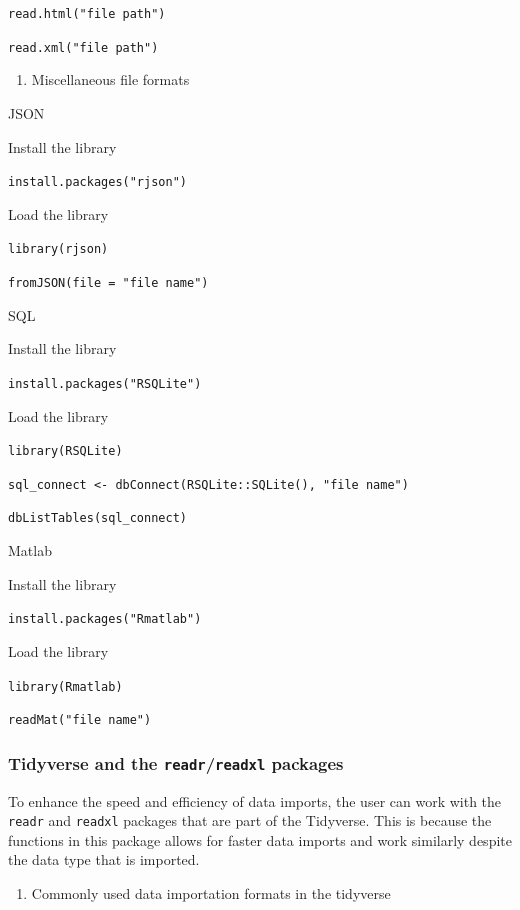 \documentclass[
  letterpaper,
  DIV=11,
  numbers=noendperiod]{scrreprt}
\providecommand{\tightlist}{%
  \setlength{\itemsep}{0pt}\setlength{\parskip}{0pt}}\usepackage{longtable,booktabs,array}
\begin{document}
\texttt{read.html("file\ path")}

\texttt{read.xml("file\ path")}

\begin{enumerate}
\def\labelenumi{\alph{enumi}.}
\setcounter{enumi}{4}
\tightlist
\item
  Miscellaneous file formats
\end{enumerate}

JSON

Install the library

\texttt{install.packages("rjson")}

Load the library

\texttt{library(rjson)}

\texttt{fromJSON(file\ =\ "file\ name")}

SQL

Install the library

\texttt{install.packages("RSQLite")}

Load the library

\texttt{library(RSQLite)}

\texttt{sql\_connect\ \textless{}-\ dbConnect(RSQLite::SQLite(),\ "file\ name")}

\texttt{dbListTables(sql\_connect)}

Matlab

Install the library

\texttt{install.packages("Rmatlab")}

Load the library

\texttt{library(Rmatlab)}

\texttt{readMat("file\ name")}

\subsubsection{\texorpdfstring{Tidyverse and the
\texttt{readr}/\texttt{readxl}
packages}{Tidyverse and the readr/readxl packages}}\label{tidyverse-and-the-readrreadxl-packages}

To enhance the speed and efficiency of data imports, the user can work
with the \texttt{readr} and \texttt{readxl} packages that are part of
the Tidyverse. This is because the functions in this package allows for
faster data imports and work similarly despite the data type that is
imported.

\begin{enumerate}
\def\labelenumi{\arabic{enumi}.}
\tightlist
\item
  Commonly used data importation formats in the tidyverse
\end{enumerate}
\end{document}
